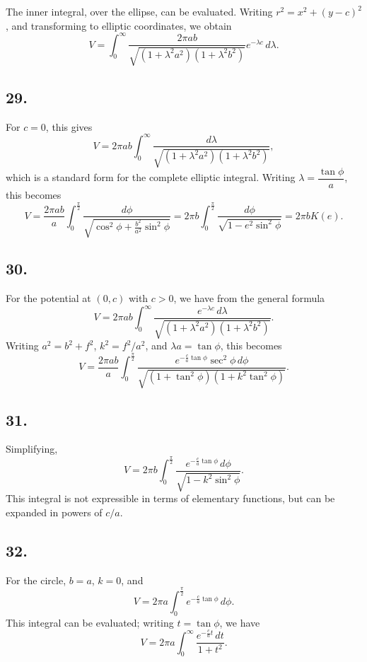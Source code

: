 \documentclass[11pt,a4paper]{book}
\begin{document}
The inner integral, over the ellipse, can be evaluated. Writing
$r^2=x^2+(y-c)^2$, and transforming to elliptic coordinates, we obtain
\[
V = \int_0^{\infty} \frac{2\pi ab}{\sqrt{(1+\lambda^2a^2)(1+\lambda^2b^2)}}
    e^{-\lambda c}\,d\lambda.
\]

\newpage
\subsection*{29.}

For $c=0$, this gives
\[
V = 2\pi ab \int_0^{\infty}
    \frac{d\lambda}{\sqrt{(1+\lambda^2a^2)(1+\lambda^2b^2)}},
\]
which is a standard form for the complete elliptic integral. Writing
$\lambda=\dfrac{\tan\phi}{a}$, this becomes
\[
V = \frac{2\pi ab}{a} \int_0^{\frac{\pi}{2}}
    \frac{d\phi}{\sqrt{\cos^2\phi+\frac{b^2}{a^2}\sin^2\phi}}
  = 2\pi b \int_0^{\frac{\pi}{2}}
    \frac{d\phi}{\sqrt{1-e^2\sin^2\phi}}
  = 2\pi b K(e).
\]

\subsection*{30.}

For the potential at $(0,c)$ with $c>0$, we have from the general formula
\[
V = 2\pi ab \int_0^{\infty}
    \frac{e^{-\lambda c}\,d\lambda}
         {\sqrt{(1+\lambda^2a^2)(1+\lambda^2b^2)}}.
\]
Writing $a^2=b^2+f^2$, $k^2=f^2/a^2$, and $\lambda a=\tan\phi$, this
becomes
\[
V = \frac{2\pi ab}{a}
    \int_0^{\frac{\pi}{2}}
    \frac{e^{-\frac{c}{a}\tan\phi}\sec^2\phi\,d\phi}
         {\sqrt{(1+\tan^2\phi)(1+k^2\tan^2\phi)}}.
\]

\newpage
\subsection*{31.}

Simplifying,
\[
V = 2\pi b \int_0^{\frac{\pi}{2}}
    \frac{e^{-\frac{c}{a}\tan\phi}\,d\phi}
         {\sqrt{1-k^2\sin^2\phi}}.
\]
This integral is not expressible in terms of elementary functions, but can be
expanded in powers of $c/a$.

\subsection*{32.}

For the circle, $b=a$, $k=0$, and
\[
V = 2\pi a \int_0^{\frac{\pi}{2}}
    e^{-\frac{c}{a}\tan\phi}\,d\phi.
\]
This integral can be evaluated; writing $t=\tan\phi$, we have
\[
V = 2\pi a \int_0^{\infty} \frac{e^{-\frac{c}{a}t}\,dt}{1+t^2}.
\]
\end{document}
